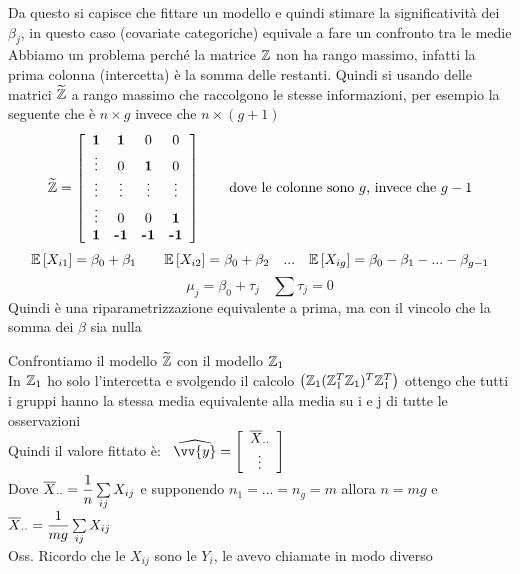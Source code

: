 Da questo si capisce che fittare un modello e quindi stimare la significatività dei $\beta_j$, in questo caso (covariate categoriche) equivale a fare un confronto tra le medie\\



Abbiamo un problema perché la matrice $\mathbb Z$ non ha rango massimo, infatti la prima colonna (intercetta) è la somma delle restanti. Quindi si usando delle matrici $\widetilde{\mathbb Z}$ a rango massimo che raccolgono le stesse informazioni, per esempio la seguente che è $n\times g$ invece che $n\times(g+1)$
\[
\widetilde{\mathbb Z} = \left[ \begin{array}{cccc}
    \textbf{1} & \textbf{1} & 0 & 0 \\
    \vdots & 0 & \textbf{1} & 0\\
    \vdots & \vdots & \vdots & \vdots\\
    \vdots & 0 & 0 & \textbf{1}\\
    \textbf{1} & \textbf{-1} & \textbf{-1} & \textbf{-1}\\
\end{array} \right]  \ \ \ \ \ \text{ dove le colonne sono $g$, invece che } g-1
\]
\[
\mathbb{E} \left[ X_{i1} \right]=\beta_0+\beta_1 \hspace{20pt} \mathbb{E} \left[ X_{i2} \right]=\beta_0+\beta_2 \hspace{10pt} ... \hspace{10pt} \mathbb{E} \left[ X_{ig} \right]=\beta_0-\beta_1- ... -\beta_{g-1}
\]
\[
\mu_j=\beta_0+\tau_j \ \ \ \ \sum \tau_j =0
\]
Quindi è una riparametrizzazione equivalente a prima, ma con il vincolo che la somma dei $\beta$ sia nulla

\phantom{}

Confrontiamo il modello $\widetilde{\mathbb Z}$ con il modello $\mathbb Z_1$\\

In $\mathbb Z_1$ ho solo l'intercetta e svolgendo il calcolo $\big(\mathbb Z_1(\mathbb Z_1^T\mathbb Z_1)^T\mathbb Z_1^T\big)$ ottengo che tutti i gruppi hanno la stessa media equivalente alla media su i e j di tutte le osservazioni\\
Quindi il valore fittato è: \ $\hat{\vv{y}}= \OO \begin{array}{c}
   \overline{X}_{\cdot \cdot}  \\
    \vdots
\end{array} \CC$\\
Dove $\overline{X}_{\cdot \cdot}=\dfrac{1}{n}\sum\limits_{ij}^{}X_{ij}$ e supponendo $n_1=...=n_g=m$ allora $n=mg$ e $\overline{X}_{\cdot \cdot}=\dfrac{1}{mg}\sum\limits_{ij}^{}X_{ij}$\\
Oss. Ricordo che le $X_{ij}$ sono le $Y_i$, le avevo chiamate in modo diverso\\


